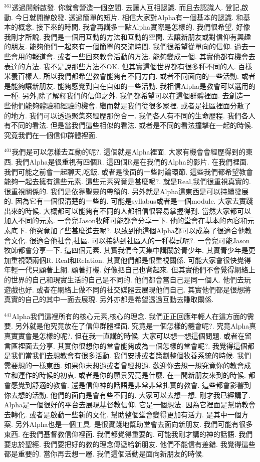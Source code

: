 \documentclass{book}
\begin{document}
$^{361}$透過開辦啟發.
你就會營造一個空間.
去讓人互相認識.
而且去認識人.
登記,啟動.
今日就開辦啟發.
透過簡單的短片.
相信大家對Alpha有一個基本的認識.
和基本的概念.
接下來的時間.
我會再講多一點Alpha實際是怎樣的.
我們很希望.
好像我剛才所說.
我們是一個用互動的方法和互動的空間.
去讓新朋友或對信仰有興趣的朋友.
能夠他們一起來有一個簡單的交流時間.
我們很希望從單向的信仰.
過去一些會用的報道會.
或者一些回來教會活動的方法.
能夠變成一個.
其實他都有機會去表達的方法.
我不是說那些方法不OK.
但其實這個世界都有很多種不同的人.
百樣米養百樣人.
所以我們都希望教會能夠有不同方向.
或者不同面向的一些活動.
或者是能夠讓新朋友.
能夠感覺到自在自如的一些活動.
我相信Alpha是教會可以選用的一種.
另外,除了解釋我們的信仰之外.
我們都希望可以在這個群體裡面.
去創造一些他們能夠體驗和經驗的機會.
繼而就是我們從很多家裡.
或者是社區裡面分散了的地方.
我們可以透過聚集來經歷那份合一.
我們各人有不同的生命歷程.
我們各人有不同的看法.
但是當我們這些相似的看法.
或者是不同的看法撞擊在一起的時候.
究竟我們在一個信仰群體裡面.

$^{401}$我們是可以怎樣去互動的呢?.
這個就是Alpha裡面.
大家有機會會經歷得到的東西.
我們Alpha是很重視有四個R.
這四個R是在我們的Alpha的影片.
在我們裡面.
我們可能之前會一起聊天,吃飯.
或者是後面的一些討論環節.
這些我們都希望教會能夠一起去擁有這些元素.
這些元素究竟是甚麼呢?.
就是Real,我們很重視真實的.
很重視關係的.
我們是依靠聖靈的帶領的.
另外就是Alpha這東西是可以持續發展的.
因為它有一個很清楚的一些的.
可能是syllabus或者是一個module.
大家去實踐出來的時候.
大概都可以能夠有不同的人都相信很容易掌握得到.
當然大家都可以加入不同的元素.
一會兒Jason牧師可能都會分享一下.
他的堂會在基本的內容和元素底下.
他究竟加了些甚麼進去呢?.
以致到他這個Alpha都可以成為了很適合他教會文化.
很適合他社會,社區.
可以接納到社區人的一種模式呢?.
一會兒可能Jason牧師都會分享一下.
這四個元素.
其實我們今天集中講關於青少年.
其實青少年是更加重視頭兩個R.
Real和Relation.
其實他們都是很重視關係.
可能大家會很快覺得年輕一代只顧著上網.
顧著打機.
好像把自己也背起來.
但其實他們不會覺得網絡上的世界的自己和現實生活的自己是不同的.
他們都會當自己是同一個人.
他們去玩遊戲也好.
或者在網絡上做不同的社交媒體去展現他們自己.
其實他們都是很想將真實的自己的其中一面去展現.
另外亦都是希望透過互動去賺取關係.

$^{441}$Alpha我們這裡所有的核心元素,核心的理念.
我們正正回應年輕人在這方面的需要.
另外就是他究竟放在了信仰群體裡面.
究竟是一個怎樣的體會呢?.
究竟Alpha真真實實會是怎樣的呢?.
但在我一直講的時候.
大家可以想一想這個問題.
或者在留言區裡面去分享.
其實你很想你的堂會能夠成為一個怎樣的堂會呢?.
我覺得這個都是我們當我們去想教會有很多活動.
我們安排或者策劃整個牧養系統的時候.
我們需要想的一樣東西.
如果你未想過或者曾經想過.
歡迎你去想一想究竟你的教會成立和運作的時候的初衷.
或者是你的願景究竟是什麼.
在一間新朋友來到的時候.
都會感覺到舒適的教會.
還是信仰神的話語是非常非常扎實的教會.
這些都會影響到你去想的活動.
他們的面向是會有些不同的.
大家可以去想一想.
剛才我已經講了.
Alpha是一個很好的平台去展現基督教信仰.
它是一個想法.
因為它裡面是幫助教會去轉化.
或者是啟動一些新的文化.
幫助整個堂會變得更加有活力.
是其中一個方案.
另外Alpha也是一個工具.
是很實踐地幫助堂會去面向新朋友.
我們可能有很多東西.
在我們基督教信仰裡面.
我們都覺得重要的.
可能我剛才講的神的話語.
我們要忠於聖經.
我們要把好的教的理念傳遞給新朋友.
他們不能信有差錯.
我覺得這些都是重要的.
當你再去想一層.
我們這個活動是面向新朋友的時候.
\end{document}
